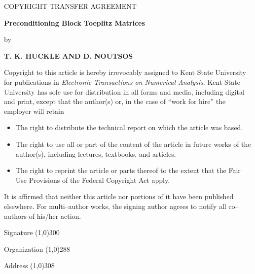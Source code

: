 \documentclass{article}
\begin{document}
\begin{center}
\Large
COPYRIGHT TRANSFER AGREEMENT
\end{center}
\medskip
\Large
\begin{center}
{\bf
Preconditioning Block Toeplitz Matrices
}
\end{center}

\begin{center}
by
\end{center}

\begin{center}
{\bf 
T. K. HUCKLE AND D. NOUTSOS
}
\end{center}
\bigskip
\normalsize
\noindent
Copyright to this article is hereby irrevocably assigned to Kent State
University for publications in {\em Electronic Transactions on Numerical
Analysis}. Kent State University has sole use for distribution in all
forms and media, including digital and print, except that the author(s)
or, in the case of ``work for hire'' the employer will retain
\begin{itemize}
\item The right to distribute the technical report on which the
article was based.
\item The right to use all or part of the content of the article in 
future works of the author(s), including lectures, textbooks, and articles.
\item The right to reprint the article or parts thereof to the extent that
the Fair Use Provisions of the Federal Copyright Act apply.
\end{itemize}
It is affirmed that neither this article nor portions of it have been 
published elsewhere. For multi--author works, the signing author agrees
to notify all co--authors of his/her action.

\bigskip
\noindent
Signature \line(1,0){300}

\bigskip
\noindent
Organization \line(1,0){288}

\bigskip
\noindent
Address \line(1,0){308}
\end{document}
